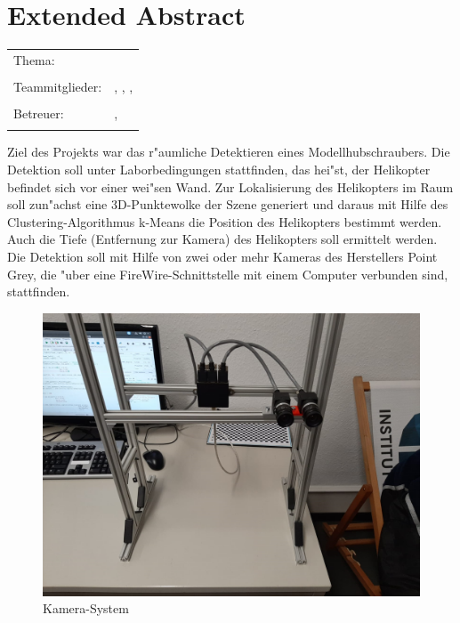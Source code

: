 \chapter*{Extended Abstract}

\begin{center}
	\begingroup
	\renewcommand*{\arraystretch}{1}
	{\makeatletter	
		\begin{tabular}{p{3.2cm}p{9.6cm}}
			Thema: & \thema \\
			& \\
			Teammitglieder: & \verfasserA, \verfasserB, 
			\verfasserC, \verfasserD\\
			& \\
			Betreuer: & \hoschschule \newline \institut \newline \prueferA, \prueferB \\
			& \\
		\end{tabular}
		
		\makeatother}
	\endgroup
\end{center}

\bigskip

\noindent
Ziel des Projekts war das r"aumliche Detektieren eines Modellhubschraubers. Die Detektion soll unter Laborbedingungen stattfinden, das hei"st, der Helikopter befindet sich vor einer wei"sen Wand.
Zur Lokalisierung des Helikopters im Raum soll zun"achst eine 3D-Punktewolke der Szene generiert und daraus mit Hilfe des Clustering-Algorithmus k-Means die Position des Helikopters bestimmt werden. Auch die Tiefe (Entfernung zur Kamera) des Helikopters soll ermittelt werden. Die Detektion soll mit Hilfe von zwei oder mehr Kameras des Herstellers Point Grey, die "uber eine FireWire-Schnittstelle mit einem Computer verbunden sind, stattfinden.

\begin{figure}[H]
	\includegraphics[scale=0.3]{bilder/camerasystem}
	\caption[Kamera-System]{Kamera-System}
\end{figure}

